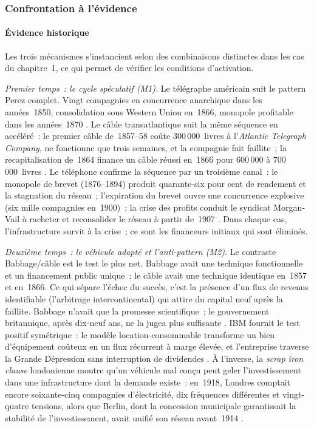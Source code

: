 \subsubsection{Confrontation à l'évidence}

\paragraph{Évidence historique}

Les trois mécanismes s'instancient selon des combinaisons distinctes dans les cas du chapitre~1, ce qui permet de vérifier les conditions d'activation.

\emph{Premier temps~: le cycle spéculatif (M1).} Le télégraphe américain suit le pattern Perez complet. Vingt compagnies en concurrence anarchique dans les années~1850, consolidation sous Western Union en~1866, monopole profitable dans les années~1870 \parencite{nonnenmacher_telegraph_2001}. Le câble transatlantique suit la même séquence en accéléré~: le premier câble de~1857--58 coûte 300\,000~livres à l'\emph{Atlantic Telegraph Company}, ne fonctionne que trois semaines, et la compagnie fait faillite~; la recapitalisation de~1864 finance un câble réussi en~1866 pour 600\,000 à 700\,000~livres \parencite{gordon_thread_2002}. Le téléphone confirme la séquence par un troisième canal~: le monopole de brevet (1876--1894) produit quarante-six pour cent de rendement et la stagnation du réseau~; l'expiration du brevet ouvre une concurrence explosive (six mille compagnies en~1900)~; la crise des profits conduit le syndicat Morgan-Vail à racheter et reconsolider le réseau à partir de~1907 \parencite{mueller_universal_1993}. Dans chaque cas, l'infrastructure survit à la crise~; ce sont les financeurs initiaux qui sont éliminés.

\emph{Deuxième temps~: le véhicule adapté et l'anti-pattern (M2).} Le contraste Babbage/câble est le test le plus net. Babbage avait une technique fonctionnelle et un financement public unique~; le câble avait une technique identique en~1857 et en~1866. Ce qui sépare l'échec du succès, c'est la présence d'un flux de revenus identifiable (l'arbitrage intercontinental) qui attire du capital neuf après la faillite. Babbage n'avait que la promesse scientifique~; le gouvernement britannique, après dix-neuf ans, ne la jugea plus suffisante \parencite{swade_difference_2001}. IBM fournit le test positif symétrique~: le modèle location-consommable transforme un bien d'équipement coûteux en un flux récurrent à marge élevée, et l'entreprise traverse la Grande Dépression sans interruption de dividendes \parencite{cortada_before_1993}. À l'inverse, la \emph{scrap iron clause} londonienne montre qu'un véhicule mal conçu peut geler l'investissement dans une infrastructure dont la demande existe~: en~1918, Londres comptait encore soixante-cinq compagnies d'électricité, dix fréquences différentes et vingt-quatre tensions, alors que Berlin, dont la concession municipale garantissait la stabilité de l'investissement, avait unifié son réseau avant~1914 \parencite{hughes_networks_1983}.

